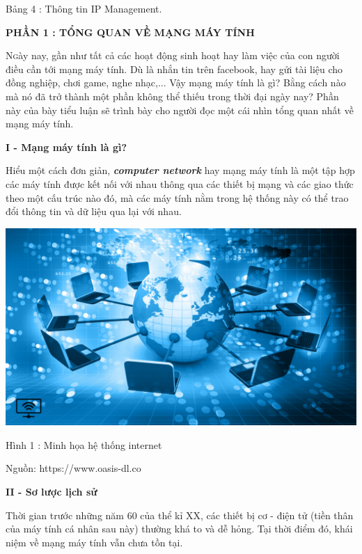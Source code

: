 \documentclass{report}
\begin{document}
Bảng 4 : Thông tin IP Management.


\newpage
\changefontsizes{16pt}
\centerline{\textbf{PHẦN 1 : TỔNG QUAN VỀ MẠNG MÁY TÍNH}}

\bigskip
\changefontsizes{13pt}
\setlength{\parindent}{1cm}
\lettrine[lines=2]{N}
gày nay, gần như tất cả các hoạt động sinh hoạt hay làm việc của con người điều cần tới mạng máy tính. Dù là nhắn tin trên facebook, hay gửi tài liệu cho đồng nghiệp, chơi game, nghe nhạc,... Vậy mạng máy tính là gì? Bằng cách nào mà nó đã trở thành một phần không thể thiếu trong thời đại ngày nay? Phần này của bày tiểu luận sẽ trình bày cho người đọc một cái nhìn tổng quan nhất về mạng máy tính.

\bigskip
\changefontsizes{14pt}
\setlength{\parindent}{0.2cm}
\textbf{I - Mạng máy tính là gì? }

\changefontsizes{13pt}
\bigskip
\setlength{\parindent}{1cm}
Hiểu một cách đơn giản, \textbf{\textit{computer network}} hay mạng máy tính là một tập hợp các máy tính được kết nối với nhau thông qua các thiết bị mạng và các giao thức theo một cấu trúc nào đó, mà các máy tính nằm trong hệ thống này có thể trao đổi thông tin và dữ liệu qua lại với nhau.

\begin{center}
     \includegraphics[scale=0.8]{Internet}
\end{center}
\centerline{Hình 1 : Minh họa hệ thống internet}
\changefontsizes{12pt}
\centerline{Nguồn: https://www.oasis-dl.co}

\bigskip
\changefontsizes{14pt}
\setlength{\parindent}{0.2cm}
\textbf{II - Sơ lược lịch sử}

\changefontsizes{13pt}
\bigskip
\setlength{\parindent}{1cm}
Thời gian trước những năm 60 của thể kỉ XX, các thiết bị cơ - điện tử (tiền thân của máy tính cá nhân sau này) thường khá to và dễ hỏng. Tại thời điểm đó, khái niệm về mạng máy tính vẫn chưa tồn tại.
\end{document}
